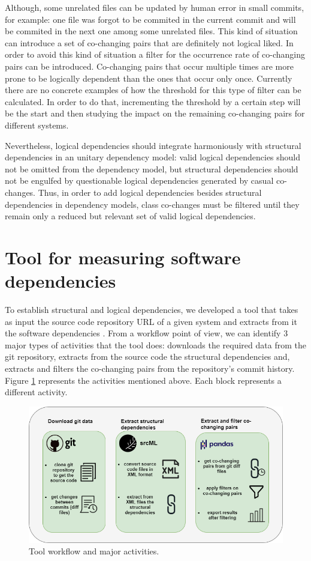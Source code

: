 \documentclass[12pt, a4paper, twoside]{report}
\begin{document}
Although, some unrelated files can be updated by human error in small commits, for example: one file was forgot to be commited in the current commit and will be commited in the next one among some unrelated files. This kind of situation can introduce a set of co-changing pairs that are definitely not logical liked. In order to avoid this kind of situation a filter for the occurrence rate of co-changing pairs can be introduced. Co-changing pairs that occur multiple times are more prone to be logically dependent than the ones that occur only once. Currently there are no concrete examples of how the threshold for this type of filter can be calculated. In order to do that, incrementing the threshold by a certain step will be the start and then studying the impact on the remaining co-changing pairs for different systems. 

Nevertheless, logical dependencies should integrate harmoniously with structural dependencies in an unitary dependency model: valid logical dependencies should not be omitted from the dependency model, but structural dependencies should not be engulfed by questionable logical dependencies generated by casual co-changes.  Thus, in order to add logical dependencies besides structural dependencies in dependency models, class co-changes must be filtered until they remain only a reduced but relevant set of valid logical dependencies. 

\section{Tool for measuring software dependencies}
\label{sec:tool}

To establish structural and logical dependencies, we developed a tool that takes as input the source code repository URL of a given system and extracts from it the software dependencies \cite{DepSACI}. 
From a workflow point of view, we can identify 3 major types of activities that the tool does: downloads the required data from the git repository, extracts from the source code the structural dependencies and, extracts and filters the co-changing pairs from the repository's commit history. Figure \ref{fig:figworkflow} represents the activities mentioned above. Each block represents a different activity. 

\begin{figure}[H]
\centering
\includegraphics[width=\textwidth]{tool_workflow.png}
\caption{Tool workflow and major activities.}
\label{fig:figworkflow}
\end{figure}
\end{document}
